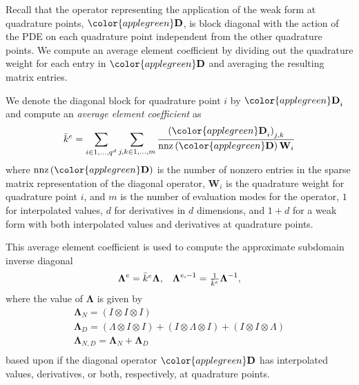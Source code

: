 Recall that the operator representing the application of the weak form at quadrature points, ${\color{applegreen}\mathbf{D}}$, is block diagonal with the action of the PDE on each quadrature point independent from the other quadrature points.
We compute an average element coefficient by dividing out the quadrature weight for each entry in ${\color{applegreen}\mathbf{D}}$ and averaging the resulting matrix entries.

\begin{definition}\label{def:averageelementcoefficient}
We denote the diagonal block for quadrature point $i$ by ${\color{applegreen}\mathbf{D}}_i$ and compute an \textit{average element coefficient} as
\begin{equation}
\bar{k}^e = \sum_{i \in 1, ..., q^d} \sum_{j, k \in 1, ..., m} \frac{\left( {\color{applegreen}\mathbf{D}}_{i} \right)_{j, k}}{\text{nnz} \left( {\color{applegreen}\mathbf{D}} \right) \mathbf{W}_i}
\end{equation}
where $\text{nnz} \left( {\color{applegreen}\mathbf{D}} \right)$ is the number of nonzero entries in the sparse matrix representation of the diagonal operator, $\mathbf{W}_i$ is the quadrature weight for quadrature point $i$, and $m$ is the number of evaluation modes for the operator, $1$ for interpolated values, $d$ for derivatives in $d$ dimensions, and $1 + d$ for a weak form with both interpolated values and derivatives at quadrature points.
\end{definition}

This average element coefficient is used to compute the approximate subdomain inverse diagonal
\begin{equation}
\begin{array}{c c}
\boldsymbol{\Lambda}^e = \bar{k}^e \boldsymbol{\Lambda},  &  \boldsymbol{\Lambda}^{e, -1} = \frac{1}{\bar{k}^e} \boldsymbol{\Lambda}^{-1},
\end{array}
\end{equation}
where the value of $\mathbf{\Lambda}$ is given by
\begin{equation}
\begin{array}{c}
\boldsymbol{\Lambda}_N      = \left( I \otimes I \otimes I \right)  \\
\boldsymbol{\Lambda}_D      = \left( \Lambda \otimes I \otimes I\right) + \left( I \otimes \Lambda \otimes I\right) + \left( I \otimes I \otimes \Lambda \right)  \\
\boldsymbol{\Lambda}_{N, D} = \boldsymbol{\Lambda}_N + \boldsymbol{\Lambda}_D  \\
\end{array}
\end{equation}
based upon if the diagonal operator ${\color{applegreen}\mathbf{D}}$ has interpolated values, derivatives, or both, respectively, at quadrature points.

